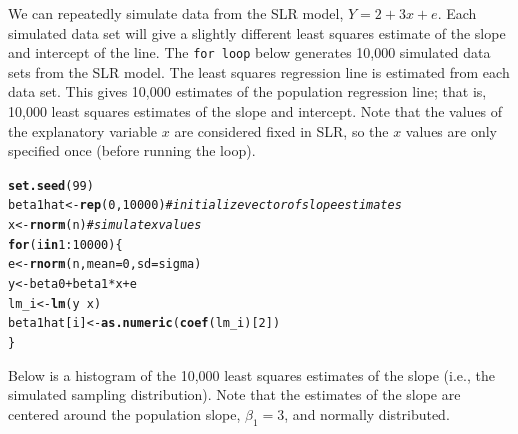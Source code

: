 \documentclass[11pt]{article}\usepackage[]{graphicx}\usepackage[]{color}
\makeatletter
\newcommand{\hlnum}[1]{\textcolor[rgb]{0.686,0.059,0.569}{#1}}%
\newcommand{\hlcom}[1]{\textcolor[rgb]{0.678,0.584,0.686}{\textit{#1}}}%
\newcommand{\hlopt}[1]{\textcolor[rgb]{0,0,0}{#1}}%
\newcommand{\hlstd}[1]{\textcolor[rgb]{0.345,0.345,0.345}{#1}}%
\newcommand{\hlkwa}[1]{\textcolor[rgb]{0.161,0.373,0.58}{\textbf{#1}}}%
\newcommand{\hlkwb}[1]{\textcolor[rgb]{0.69,0.353,0.396}{#1}}%
\newcommand{\hlkwc}[1]{\textcolor[rgb]{0.333,0.667,0.333}{#1}}%
\newcommand{\hlkwd}[1]{\textcolor[rgb]{0.737,0.353,0.396}{\textbf{#1}}}%
\newenvironment{kframe}{%
 \def\at@end@of@kframe{}%
 \ifinner\ifhmode%
  \def\at@end@of@kframe{\end{minipage}}%
  \begin{minipage}{\columnwidth}%
 \fi\fi%
 \def\FrameCommand##1{\hskip\@totalleftmargin \hskip-\fboxsep
 \colorbox{shadecolor}{##1}\hskip-\fboxsep
     \hskip-\linewidth \hskip-\@totalleftmargin \hskip\columnwidth}%
 \MakeFramed {\advance\hsize-\width
   \@totalleftmargin\z@ \linewidth\hsize
   \@setminipage}}%
 {\par\unskip\endMakeFramed%
 \at@end@of@kframe}
\newenvironment{knitrout}{}{} %
\makeatother
\begin{document}
We can repeatedly simulate data from the SLR model, $Y = 2 + 3x + e$.  Each simulated data set will give a slightly different least squares estimate of the slope and intercept of the line.  The \texttt{for loop} below generates 10,000 simulated data sets from the SLR model.  The least squares regression line is estimated from each data set.  This gives 10,000 estimates of the population regression line; that is, 10,000 least squares estimates of the slope and intercept.  Note that the values of the explanatory variable $x$ are considered fixed in SLR, so the $x$ values are only specified once (before running the loop).


\begin{knitrout}
\color{fgcolor}\begin{kframe}
\begin{alltt}
\hlkwd{set.seed}\hlstd{(}\hlnum{99}\hlstd{)}
\hlstd{beta1hat} \hlkwb{<-} \hlkwd{rep}\hlstd{(}\hlnum{0}\hlstd{,} \hlnum{10000}\hlstd{)} \hlcom{# initialize vector of slope estimates}
\hlstd{x} \hlkwb{<-} \hlkwd{rnorm}\hlstd{(n)} \hlcom{# simulate x values}
\hlkwa{for}\hlstd{(i} \hlkwa{in} \hlnum{1}\hlopt{:}\hlnum{10000}\hlstd{) \{}
  \hlstd{e} \hlkwb{<-} \hlkwd{rnorm}\hlstd{(n,} \hlkwc{mean}\hlstd{=}\hlnum{0}\hlstd{,} \hlkwc{sd}\hlstd{=sigma)}
  \hlstd{y} \hlkwb{<-} \hlstd{beta0} \hlopt{+} \hlstd{beta1} \hlopt{*} \hlstd{x} \hlopt{+} \hlstd{e}
  \hlstd{lm_i} \hlkwb{<-} \hlkwd{lm}\hlstd{(y} \hlopt{~} \hlstd{x)}
  \hlstd{beta1hat[i]} \hlkwb{<-} \hlkwd{as.numeric}\hlstd{(}\hlkwd{coef}\hlstd{(lm_i)[}\hlnum{2}\hlstd{])}
\hlstd{\}}
\end{alltt}
\end{kframe}
\end{knitrout}

Below is a histogram of the 10,000 least squares estimates of the slope (i.e., the simulated sampling distribution).  Note that the estimates of the slope are centered around the population slope, $\beta_1 = 3$, and normally distributed.  
\end{document}
